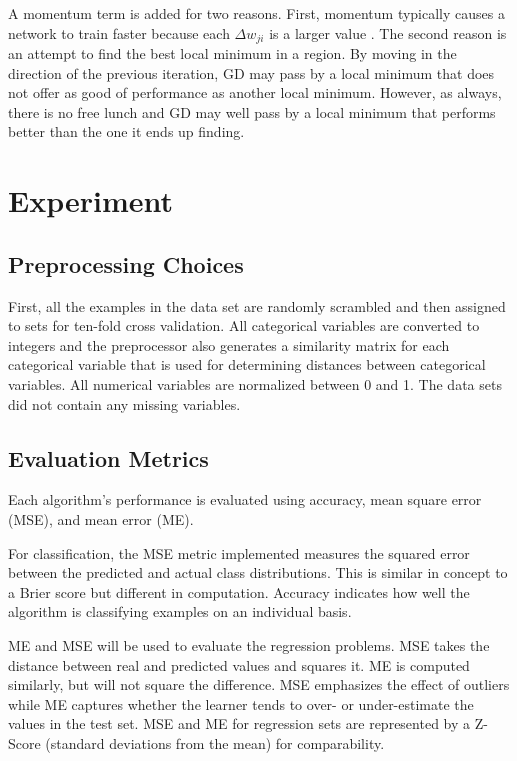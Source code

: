 \documentclass[twoside,10pt]{article}
\begin{document}
A momentum term is added for two reasons. First, momentum typically causes a network to train faster because each $\Delta w_{ji}$ is a larger value \citep{rumelhart1988learning}.
The second reason is an attempt to find the best local minimum in a region.
By moving in the direction of the previous iteration, GD may pass by a local minimum that does not offer as good of performance as another local minimum.
However, as always, there is no free lunch and GD may well pass by a local minimum that performs better than the one it ends up finding.

\section{Experiment}

\subsection{Preprocessing Choices}
First, all the examples in the data set are randomly scrambled and then assigned to sets
for ten-fold cross validation. All categorical variables are converted to integers and the
preprocessor also generates a similarity matrix for each categorical variable that is used for
determining distances between categorical variables. All numerical variables are normalized
between 0 and 1. The data sets did not contain any missing variables.

\subsection{Evaluation Metrics}
Each algorithm's performance is evaluated using accuracy, mean square error (MSE), and mean error (ME).

For classification, the MSE metric implemented measures the squared error between the predicted and actual class distributions. This is similar in concept to a Brier score but different in computation.  Accuracy indicates how well the algorithm is classifying examples on an individual basis.

ME and MSE will be used to evaluate the regression problems. MSE takes the distance between real and predicted values and squares it. ME is computed similarly, but will not square the difference. MSE emphasizes the effect of outliers while ME captures whether the learner tends to over- or under-estimate the values in the test set. MSE and ME for regression sets are represented by a Z-Score (standard deviations from the mean) for comparability.
\end{document}
